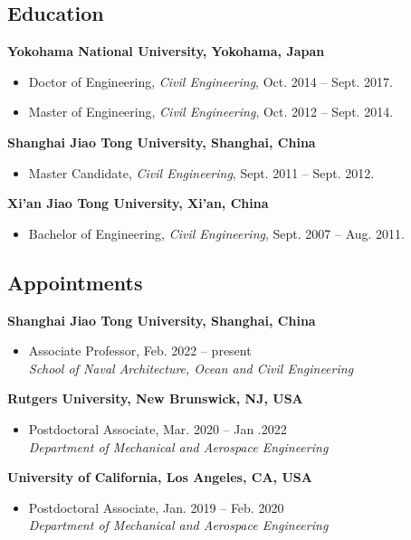 \documentclass[10pt]{article}
\newenvironment{myitemize}
{ \begin{itemize}
    \setlength{\itemsep}{0pt}
    \setlength{\parskip}{0pt}
    \setlength{\parsep}{0pt}     }
{ \end{itemize}                  }
\begin{document}
\subsection*{Education}

 {\bf\color{Blue} Yokohama National University, Yokohama, Japan}		
\begin{myitemize}
\item Doctor of Engineering, 
{\em Civil Engineering}, Oct. 2014 -- Sept. 2017.
\item Master of Engineering,
{\em Civil Engineering}, Oct. 2012 -- Sept. 2014.
\end{myitemize}

{\bf\color{Blue} Shanghai Jiao Tong University, Shanghai, China}
\begin{myitemize}
\item Master Candidate, 
{\em Civil Engineering}, Sept. 2011 -- Sept. 2012.
\end{myitemize}

{\bf\color{Blue} Xi'an Jiao Tong University, Xi'an, China}
\begin{myitemize}
\item Bachelor of Engineering, 
{\em Civil Engineering}, Sept. 2007 -- Aug. 2011.
\end{myitemize}

\subsection*{Appointments}

{\bf \color{Blue} Shanghai Jiao Tong University, Shanghai, China} 
\begin{myitemize}
\item Associate Professor, Feb. 2022 -- present \\
{\em School of Naval Architecture, Ocean and Civil Engineering}
\end{myitemize}

{\bf \color{Blue} Rutgers University, New Brunswick, NJ, USA} 
\begin{myitemize}
\item  Postdoctoral Associate, Mar. 2020 -- Jan .2022\\
{\em Department of Mechanical and Aerospace Engineering}
\end{myitemize}

{\bf \color{Blue} University of California, Los Angeles, CA, USA} 
\begin{myitemize}
\item  Postdoctoral Associate, Jan. 2019 -- Feb. 2020\\
{\em Department of Mechanical and Aerospace Engineering}
\end{myitemize}
\end{document}

